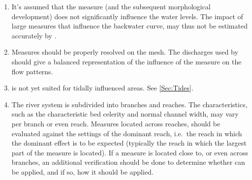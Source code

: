 \begin{enumerate}
\item It's assumed that the measure (and the subsequent morphological development) does not significantly influence the water levels.
The impact of large measures that influence the backwater curve, may thus not be estimated accurately by \dfmi.

\item Measures should be properly resolved on the \dflowfm mesh.
The discharges used by \dfmi should give a balanced representation of the influence of the measure on the flow patterns.

\item \dfastmi is not yet suited for tidally influenced areas.
See \autoref{Sec:Tides}.

\item The river system is subdivided into branches and reaches.
The characteristics, such as the characteristic bed celerity and normal channel width, may vary per branch or even reach.
Measures located across reaches, should be evaluated against the settings of the dominant reach, i.e.~the reach in which the dominant effect is to be expected (typically the reach in which the largest part of the measure is located).
If a measure is located close to, or even across branches, an additional verification should be done to determine whether \dfmi can be applied, and if so, how it should be applied.


\end{enumerate}
